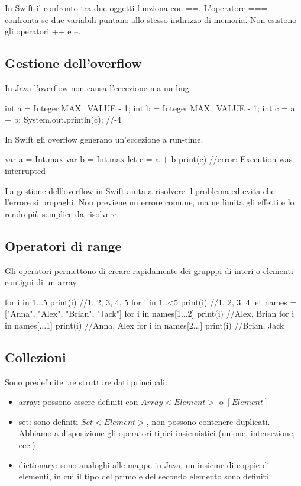 In Swift il confronto tra due oggetti funziona con ==. L'operatore === confronta se due variabili puntano allo stesso indirizzo di memoria.
Non esistono gli operatori ++ e --.

\subsection{Gestione dell'overflow}
In Java l'overflow non causa l'eccezione ma un bug. 
\begin{Java}
    int a = Integer.MAX_VALUE - 1;
    int b = Integer.MAX_VALUE - 1;
    int c = a + b;
    System.out.println(c); //-4
\end{Java}
In Swift gli overflow generano un'eccezione a run-time. 
\begin{Swift}
    var a = Int.max
    var b = Int.max
    let c = a + b
    print(c) //error: Execution was interrupted
\end{Swift}

La gestione dell'overflow in Swift aiuta a risolvere il problema ed evita che l'errore si propaghi. Non previene un errore comune, ma ne limita gli effetti e lo rendo più semplice da risolvere. 

\subsection{Operatori di range}
Gli operatori permettono di creare rapidamente dei grupppi di interi o elementi contigui di un array.
\begin{Swift}
    for i in 1...5 {
        print(i)
    } //1, 2, 3, 4, 5
    for i in 1..<5 {
        print(i)
    } //1, 2, 3, 4
    let names = ["Anna", "Alex", "Brian", 
    "Jack"]
    for i in names[1...2] {print(i)} //Alex, Brian
    for i in names[...1] {print(i)} //Anna, Alex
    for i in names[2...] {print(i)} //Brian, Jack
\end{Swift}

\subsection{Collezioni}
Sono predefinite tre strutture dati principali:
\begin{itemize}
    \item array: possono essere definiti con $Array<Element>$ o $[Element]$
    \item set: sono definiti $Set<Element>$, non possono contenere duplicati. Abbiamo a disposizione gli operatori tipici insiemistici (unione, intersezione, ecc.)
    \item dictionary: sono analoghi alle mappe in Java, un insieme di coppie di elementi, in cui il tipo del primo e del secondo elemento sono definiti
\end{itemize}

